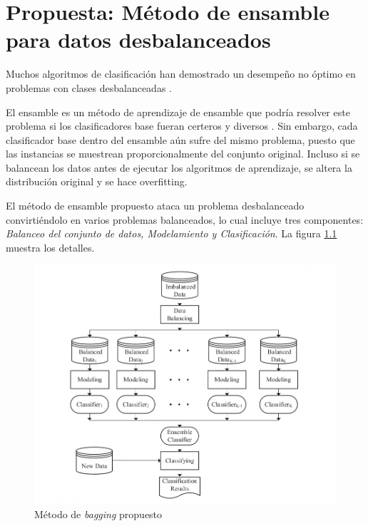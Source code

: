 \chapter{Propuesta: Método de ensamble para datos desbalanceados}




Muchos algoritmos de clasificación han demostrado un desempeño no óptimo en problemas con clases desbalanceadas \citep{batista2004study, mani2003knn, seiffert2010rusboost}.

El ensamble es un método de aprendizaje de ensamble que podría resolver este problema si los clasificadores base fueran certeros y diversos \citep{breiman1996bagging}. Sin embargo, cada clasificador base dentro del ensamble aún sufre del mismo problema, puesto que las instancias se muestrean proporcionalmente del conjunto original. Incluso si se balancean los datos antes de ejecutar los algoritmos de aprendizaje, se altera la distribución original y se hace overfitting.

El método de ensamble propuesto \citep{sun2015novel} ataca un problema desbalanceado convirtiéndolo en varios problemas balanceados, lo cual incluye tres componentes: \textit{Balanceo del conjunto de datos, Modelamiento y Clasificación}. La figura \ref{fig:bagging-imbalanced} muestra los detalles.

\begin{figure}
	\centering
	\includegraphics[width=\linewidth]{graficos/bagging_imbalanced.png}
	\caption{Método de \textit{bagging} propuesto \citep{sun2015novel}}
	\label{fig:bagging-imbalanced}
\end{figure}


